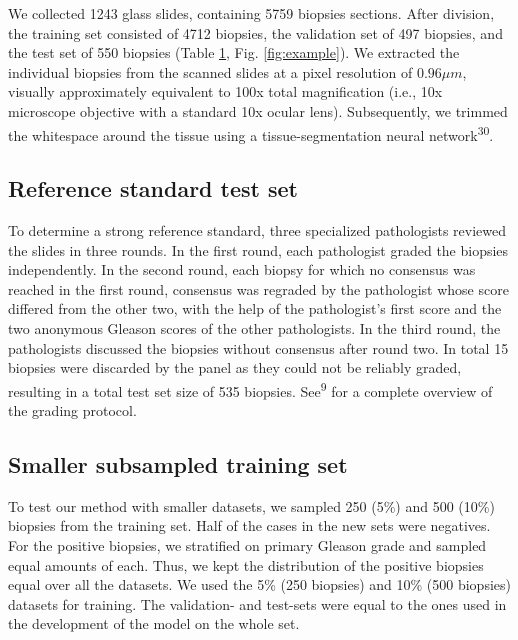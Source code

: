 \documentclass[
  12pt,
  a5,margin=2cmpaper,
]{article}
\begin{document}
We collected 1243 glass slides, containing 5759 biopsies sections. After
division, the training set consisted of 4712 biopsies, the validation
set of 497 biopsies, and the test set of 550 biopsies (Table
\protect\hyperlink{tab:extset}{1}, Fig.
\protect\hyperlink{fig:example}{{[}fig:example{]}}). We extracted the
individual biopsies from the scanned slides at a pixel resolution of
\(0.96 \mu m\), visually approximately equivalent to 100x total
magnification (i.e., 10x microscope objective with a standard 10x ocular
lens). Subsequently, we trimmed the whitespace around the tissue using a
tissue-segmentation neural network\textsuperscript{30}.

\hypertarget{reference-standard-test-set}{%
\subsection{Reference standard test
set}\label{reference-standard-test-set}}

To determine a strong reference standard, three specialized pathologists
reviewed the slides in three rounds. In the first round, each
pathologist graded the biopsies independently. In the second round, each
biopsy for which no consensus was reached in the first round, consensus
was regraded by the pathologist whose score differed from the other two,
with the help of the pathologist's first score and the two anonymous
Gleason scores of the other pathologists. In the third round, the
pathologists discussed the biopsies without consensus after round two.
In total 15 biopsies were discarded by the panel as they could not be
reliably graded, resulting in a total test set size of 535 biopsies.
See\textsuperscript{9} for a complete overview of the grading protocol.

\hypertarget{smaller-subsampled-training-set}{%
\subsection{Smaller subsampled training
set}\label{smaller-subsampled-training-set}}

To test our method with smaller datasets, we sampled 250 (5\%) and 500
(10\%) biopsies from the training set. Half of the cases in the new sets
were negatives. For the positive biopsies, we stratified on primary
Gleason grade and sampled equal amounts of each. Thus, we kept the
distribution of the positive biopsies equal over all the datasets. We
used the 5\% (250 biopsies) and 10\% (500 biopsies) datasets for
training. The validation- and test-sets were equal to the ones used in
the development of the model on the whole set.
\end{document}
